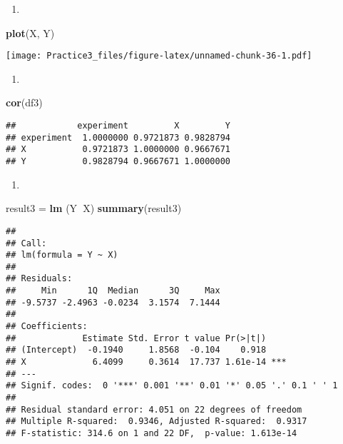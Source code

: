 \documentclass[
]{article}
\newenvironment{Shaded}{\begin{snugshade}}{\end{snugshade}}
\newcommand{\KeywordTok}[1]{\textcolor[rgb]{0.13,0.29,0.53}{\textbf{#1}}}
\newcommand{\NormalTok}[1]{#1}
\newcommand{\OperatorTok}[1]{\textcolor[rgb]{0.81,0.36,0.00}{\textbf{#1}}}
\newcommand{\StringTok}[1]{\textcolor[rgb]{0.31,0.60,0.02}{#1}}
\begin{document}
\begin{enumerate}
\def\labelenumi{(\alph{enumi})}
\item
\end{enumerate}

\begin{Shaded}
\begin{Highlighting}[]
\KeywordTok{plot}\NormalTok{(X, Y)}
\end{Highlighting}
\end{Shaded}

\texttt{[image: Practice3\_files/figure-latex/unnamed-chunk-36-1.pdf]}

\begin{enumerate}
\def\labelenumi{(\alph{enumi})}
\setcounter{enumi}{1}
\item
\end{enumerate}

\begin{Shaded}
\begin{Highlighting}[]
\KeywordTok{cor}\NormalTok{(df3)}
\end{Highlighting}
\end{Shaded}

\begin{verbatim}
##            experiment         X         Y
## experiment  1.0000000 0.9721873 0.9828794
## X           0.9721873 1.0000000 0.9667671
## Y           0.9828794 0.9667671 1.0000000
\end{verbatim}

\begin{enumerate}
\def\labelenumi{(\alph{enumi})}
\setcounter{enumi}{2}
\item
\end{enumerate}

\begin{Shaded}
\begin{Highlighting}[]
\NormalTok{result3 =}\StringTok{ }\KeywordTok{lm}\NormalTok{ (Y}\OperatorTok{~}\NormalTok{X)}
\KeywordTok{summary}\NormalTok{(result3)}
\end{Highlighting}
\end{Shaded}

\begin{verbatim}
## 
## Call:
## lm(formula = Y ~ X)
## 
## Residuals:
##     Min      1Q  Median      3Q     Max 
## -9.5737 -2.4963 -0.0234  3.1574  7.1444 
## 
## Coefficients:
##             Estimate Std. Error t value Pr(>|t|)    
## (Intercept)  -0.1940     1.8568  -0.104    0.918    
## X             6.4099     0.3614  17.737 1.61e-14 ***
## ---
## Signif. codes:  0 '***' 0.001 '**' 0.01 '*' 0.05 '.' 0.1 ' ' 1
## 
## Residual standard error: 4.051 on 22 degrees of freedom
## Multiple R-squared:  0.9346, Adjusted R-squared:  0.9317 
## F-statistic: 314.6 on 1 and 22 DF,  p-value: 1.613e-14
\end{verbatim}
\end{document}
